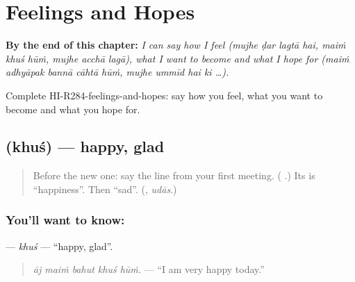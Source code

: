 
\chapter{Feelings and Hopes}
\label{ch:hi-feelings-and-hopes}

\begin{chapteropening}
\textbf{By the end of this chapter:} \emph{I can say how I feel (mujhe ḍar lagtā hai, maiṁ khuś hūṁ, mujhe acchā lagā), what I want to become and what I hope for (maiṁ adhyāpak bannā cāhtā hūṁ, mujhe ummīd hai ki …).}

Complete HI-R284-feelings-and-hopes: say how you feel, what you want to become and what you hope for.
\end{chapteropening}

\section[\texorpdfstring{\hi{ख़ुश} (khuś)}{ख़ुश (khuś)}]{ (khuś) — happy, glad}

\label{lesson:HI-C284-khush}



\begin{quote}
Before the new one: say the line from your first meeting. (\textbf{   }.) Its \textbf{} is \textquotedblleft{}happiness\textquotedblright{}. Then \textquotedblleft{}sad\textquotedblright{}. (\textbf{}, \emph{udās}.)
\end{quote}

\subsection*{You'll want to know: }
\textbf{} — \emph{khuś} — \textquotedblleft{}happy, glad\textquotedblright{}.

\begin{quote}
\textbf{    }
\end{quote}

\begin{quote}
\emph{āj maiṁ bahut khuś hūṁ.} — \textquotedblleft{}I am very happy today.\textquotedblright{}
\end{quote}

